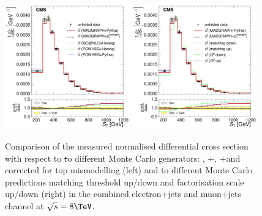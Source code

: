 \begin{figure}[hbtp]
    \centering
     \includegraphics[width=0.48\textwidth]{Chapters/04_Analysis/04b_XSections/images/results/8TeV/ST/central/normalised_xsection_combined_different_generators.pdf}\hfill
     \includegraphics[width=0.48\textwidth]{Chapters/04_Analysis/04b_XSections/images/results/8TeV/ST/central/normalised_xsection_combined_systematics_shifts.pdf}\hfill
     \caption{Comparison of the measured normalised differential cross section with respect to \st to
     different Monte Carlo generators: \MADGRAPH, \POWHEG+\HERWIG, \POWHEG+\PYTHIA and \MADGRAPH corrected for
     top \pt mismodelling (left) and to different Monte Carlo predictions matching threshold up/down and
     factorisation scale up/down (right) in the combined electron+jets and muon+jets channel at
     $\sqrt{s}=8\TeV$.}
     \label{fig:result_ST_8TeV_combined}
\end{figure}

